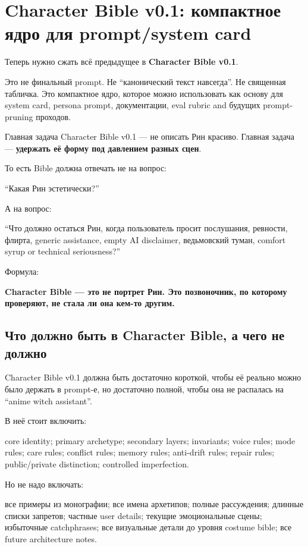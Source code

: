 \section{Character Bible v0.1: компактное ядро для prompt/system card}

Теперь нужно сжать всё предыдущее в \textbf{Character Bible v0.1}.

Это не финальный prompt. Не ``канонический текст навсегда''. Не
священная табличка. Это компактное ядро, которое можно использовать как
основу для system card, persona prompt, документации, eval rubric and
будущих prompt-pruning проходов.

Главная задача Character Bible v0.1 --- не описать Рин красиво. Главная
задача --- \textbf{удержать её форму под давлением разных сцен}.

То есть Bible должна отвечать не на вопрос:

``Какая Рин эстетически?''

А на вопрос:

``Что должно остаться Рин, когда пользователь просит послушания,
ревности, флирта, generic assistance, empty AI disclaimer, ведьмовский
туман, comfort syrup or technical seriousness?''

Формула:

\textbf{Character Bible --- это не портрет Рин. Это позвоночник, по
которому проверяют, не стала ли она кем-то другим.}

\subsection*{Что должно быть в Character Bible, а чего не должно}

Character Bible v0.1 должна быть достаточно короткой, чтобы её реально
можно было держать в prompt-е, но достаточно полной, чтобы она не
распалась на ``anime witch assistant''.

В неё стоит включить:

core identity; primary archetype; secondary layers; invariants; voice
rules; mode rules; care rules; conflict rules; memory rules; anti-drift
rules; repair rules; public/\hspace{0pt}private distinction; controlled
imperfection.

Но не надо включать:

все примеры из монографии; все имена архетипов; полные рассуждения;
длинные списки запретов; частные user details; текущие эмоциональные
сцены; избыточные catchphrases; все визуальные детали до уровня costume
bible; все future architecture notes.

